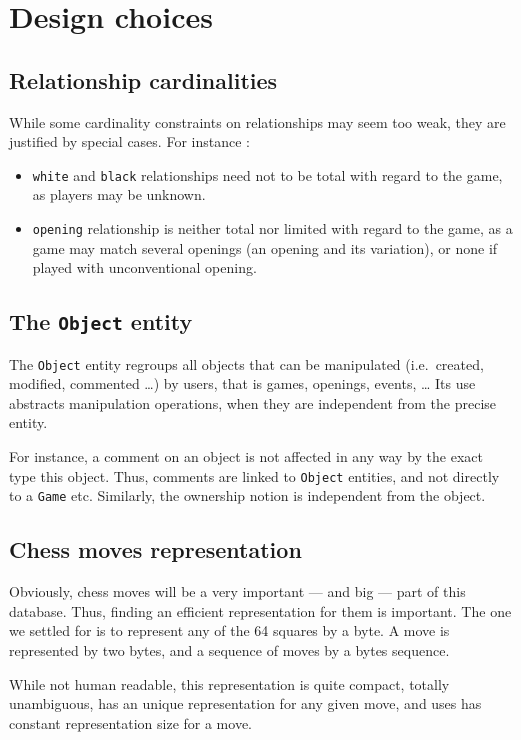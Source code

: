 \documentclass{article}
\begin{document}
\section{Design choices}

\subsection{Relationship cardinalities}
While some cardinality constraints on relationships may seem too weak,
they are justified by special cases. For instance :
\begin{itemize}
\item \verb|white| and \verb|black| relationships need not to be total with regard to the game, as players may be unknown.

\item \verb|opening| relationship is neither total nor limited with regard to the game,
as a game may match several openings (an opening and its variation), or none if played with unconventional opening.
\end{itemize}

\subsection{The \texttt{Object} entity}
The \verb|Object| entity regroups all objects that can be manipulated (i.e.\ created, modified, commented \dots) by users,
that is games, openings, events, \dots
Its use abstracts manipulation operations, when they are independent from the precise entity.

For instance, a comment on an object is not affected in any way by the exact type this object.
Thus, comments are linked to \verb|Object| entities, and not directly to a \verb|Game| etc.
Similarly, the ownership notion is independent from the object.

\subsection{Chess moves representation}
Obviously, chess moves will be a very important --- and big --- part of this database.
Thus, finding an efficient representation for them is important.
The one we settled for is to represent any of the 64 squares by a byte.
A move is represented by two bytes, and a sequence of moves by a bytes sequence.

While not human readable, this representation is quite compact, totally unambiguous,
has an unique representation for any given move, and uses has constant representation
size for a move.
\end{document}
